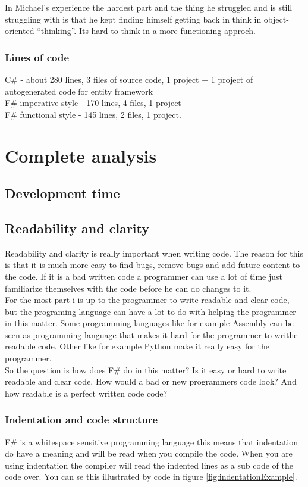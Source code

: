 \documentclass[12pt, a4paper]{article}
\begin{document}
In Michael’s experience the hardest part and the thing he struggled and is still struggling with is that he kept finding himself getting back in think in object-oriented “thinking”. Its hard to think in a more functioning approch.
\subsubsection{Lines of code}
C\# - about 280 lines, 3 files of source code, 1 project + 1 project of autogenerated code for entity framework\\
F\# imperative style - 170 lines, 4 files, 1 project\\

F\# functional style - 145 lines, 2 files, 1 project.
\newpage

\section{Complete analysis}
\subsection{Development time}

\newpage
\subsection{Readability and clarity}
Readability and clarity is really important when writing code. The reason for this is that it is much more easy to find bugs, remove bugs and add future content to the code. If it is a bad written code a programmer can use a lot of time just familiarize themselves with the code before he can do changes to it.\\

For the most part i is up to the programmer to write readable and clear code, but the programing language can have a lot to do with helping the programmer in this matter. Some programming languages like for example Assembly can be seen as programming language that makes it hard for the programmer to writhe readable code. Other like for example Python make it really easy for the programmer.\\

So the question is how does F\# do in this matter? Is it easy or hard to write readable and clear code. How would a bad or new programmers code look? And how readable is a perfect written code code?

\newpage
\subsubsection{Indentation and code structure}
F\# is a whitespace sensitive programming language this means that indentation do have a meaning and will be read when you compile the code. When you are using indentation the compiler will read the indented lines as a sub code of the code over. You can se this illustrated by code in figure \ref{fig:indentationExample}.
\end{document}
